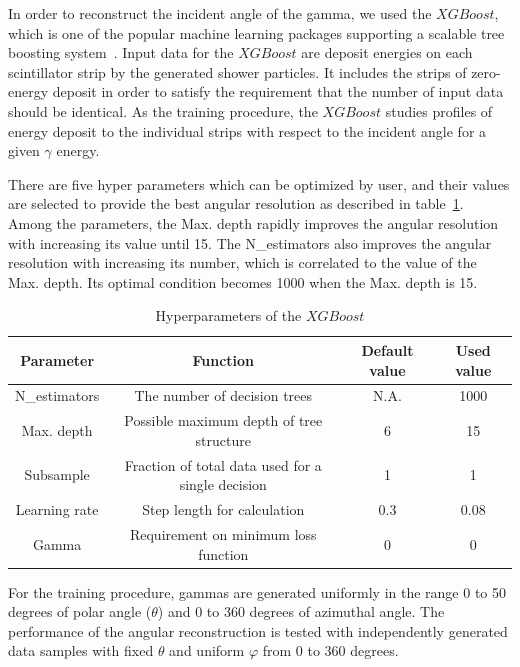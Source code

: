 \documentclass[jkps,preprint,fleqn,showpacs,showkeys]{revtex4}
\newcommand{\XGB}{XGBoost}
\begin{document}

In order to reconstruct the incident angle of the gamma, we used the $\XGB$, which is one of the popular machine learning packages supporting a scalable tree boosting system~\cite{xgboost:2016}. Input data for the $\XGB$ are deposit energies on each scintillator strip by the generated shower particles. It includes the strips of zero-energy deposit in order to satisfy the requirement that the number of input data should be identical. As the training procedure, the $\XGB$ studies profiles of energy deposit to the individual strips with respect to the incident angle for a given $\gamma$ energy. 

There are five hyper parameters which can be optimized by user, and their values are selected to provide the best angular resolution as described in table~\ref{tab:XgbPar}. Among the parameters, the Max. depth rapidly improves the angular resolution with increasing its value until 15. The N\_estimators also improves the angular resolution with increasing its number, which is correlated to the value of the Max. depth. Its optimal condition becomes 1000 when the Max. depth is 15.

\begin{table}[hbt!]
\centering
\caption{Hyperparameters of the $\XGB$}
\begin{tabular}{cccc}
\hline 
Parameter & Function & Default value & Used value \\ \hline 
N\_estimators & The number of decision trees & N.A. & 1000 \\  
Max. depth & Possible maximum depth of tree structure & 6 & 15 \\ 
Subsample & Fraction of total data used for a single decision & 1 & 1 \\ 
Learning rate & Step length for calculation & 0.3 & 0.08 \\ 
Gamma & Requirement on minimum loss function & 0 & 0 \\ 
\hline
\end{tabular}
\label{tab:XgbPar}
\end{table}

For the training procedure, gammas are generated uniformly in the range 0 to 50 degrees of polar angle ($\theta$) and  0 to 360 degrees of azimuthal angle. The performance of the angular reconstruction is tested with independently generated data samples with fixed $\theta$ and uniform $\varphi$ from 0 to 360 degrees.
\end{document}

